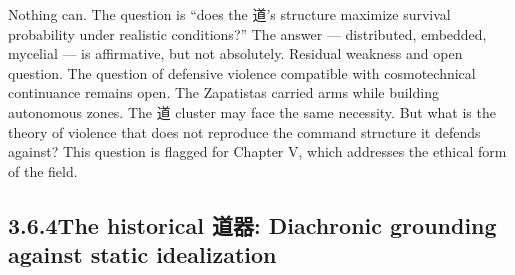 Nothing can. The question is “does the 道’s structure maximize survival probability under realistic conditions?” The answer — distributed, embedded, mycelial — is affirmative, but not absolutely. Residual weakness and open question. The question of defensive violence compatible with cosmotechnical continuance remains open. The Zapatistas carried arms while building autonomous zones. The 道 cluster may face the same necessity. But what is the theory of violence that does not reproduce the command structure it defends against? This question is flagged for Chapter V, which addresses the ethical form of the field.

\subsection{3.6.4\quad The historical 道器: Diachronic grounding against static idealization}

